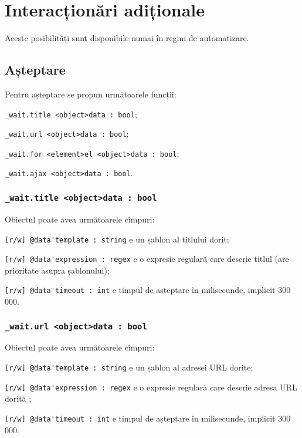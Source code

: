 \section{Interacționări adiționale}

Aceste posibilități sunt disponibile numai în regim de automatizare.

\subsection{Așteptare}

Pentru așteptare se propun următoarele funcții:
\begin{icItems}
	\item \lstinline|_wait.title <object>data : bool|;
	\item \lstinline|_wait.url <object>data : bool|;
	\item \lstinline|_wait.for <element>el <object>data : bool|;
	\item \lstinline|_wait.ajax <object>data : bool|.
\end{icItems}

\subsubsection{\lstinline|_wait.title <object>data : bool|}

Obiectul  poate avea următoarele cîmpuri:
\begin{icItems}
	\item \lstinline|[r/w] @data'template : string| e un șablon al titlului dorit;
	\item \lstinline|[r/w] @data'expression : regex| e o expresie regulară care descrie titlul (are prioritate asupra șablonului);
	\item \lstinline|[r/w] @data'timeout : int| e timpul de așteptare în milisecunde, implicit 300 000.
\end{icItems}

\subsubsection{\lstinline|_wait.url <object>data : bool|}

Obiectul  poate avea următoarele cîmpuri:
\begin{icItems}
	\item \lstinline|[r/w] @data'template : string| e un șablon al adresei URL dorite;
	\item \lstinline|[r/w] @data'expression : regex| e o expresie regulară care descrie adresa URL dorită ;
	\item \lstinline|[r/w] @data'timeout : int| e timpul de așteptare în milisecunde, implicit 300 000.
\end{icItems}

